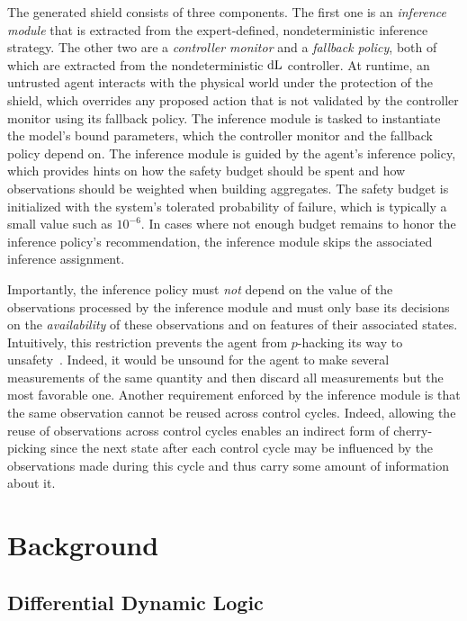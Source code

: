 \documentclass[acmsmall,screen,nonacm]{acmart}
\begin{document}
The generated shield consists of three components. The first one is an \emph{inference module} that is extracted from the expert-defined, nondeterministic inference strategy. The other two are a \emph{controller monitor} and a \emph{fallback policy}, both of which are extracted from the nondeterministic $\mathop{}\!\mathrm{d} \text{L}$ controller. At runtime, an untrusted agent interacts with the physical world under the protection of the shield, which overrides any proposed action that is not validated by the controller monitor using its fallback policy. The inference module is tasked to instantiate the model's bound parameters, which the controller monitor and the fallback policy depend on. The inference module is guided by the agent's inference policy, which provides hints on how the safety budget should be spent and how observations should be weighted when building aggregates. The safety budget is initialized with the system's tolerated probability of failure, which is typically a small value such as $10^{-6}$. In cases where not enough budget remains to honor the inference policy's recommendation, the inference module skips the associated inference assignment.

Importantly, the inference policy must \emph{not} depend on the value of the observations processed by the inference module and must only base its decisions on the \emph{availability} of these observations and on features of their associated states. Intuitively, this restriction prevents the agent from $p$-hacking its way to unsafety~\cite{significant}. Indeed, it would be unsound for the agent to make several measurements of the same quantity and then discard all measurements but the most favorable one. Another requirement enforced by the inference module is that the same observation cannot be reused across control cycles. Indeed, allowing the reuse of observations across control cycles enables an indirect form of cherry-picking since the next state after each control cycle may be influenced by the observations made during this cycle and thus carry some amount of information about it.


\section{Background}

\subsection{Differential Dynamic Logic}\label{sec:dL-semantics}
\end{document}
